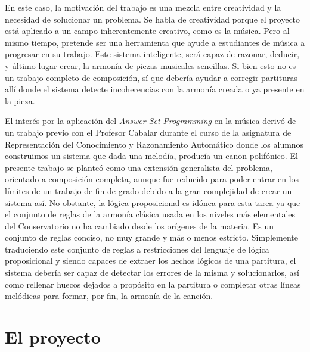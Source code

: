  En este caso, la motivación del trabajo es una mezcla entre creatividad y la necesidad de solucionar un problema. Se habla de creatividad porque el proyecto está aplicado a un campo inherentemente creativo, como es la música. Pero al mismo tiempo, pretende ser una herramienta que ayude a estudiantes de música a progresar en su trabajo. Este sistema inteligente, será capaz de razonar, deducir, y último lugar crear, la armonía de piezas musicales sencillas. Si bien esto no es un trabajo completo de composición, sí que debería ayudar a corregir partituras allí donde el sistema detecte incoherencias con la armonía creada o ya presente en la pieza. 
 
 El interés por la aplicación del \textit{Answer Set Programming} en la música derivó de un trabajo previo con el Profesor Cabalar durante el curso de la asignatura de Representación del Conocimiento y Razonamiento Automático donde los alumnos construimos un sistema que dada una melodía, producía un canon polifónico. El presente trabajo se planteó como una extensión generalista del problema, orientado a composición completa, aunque fue reducido para poder entrar en los límites de un trabajo de fin de grado debido a la gran complejidad de crear un sistema así. No obstante, la lógica proposicional es idónea para esta tarea ya que el conjunto de reglas de la armonía clásica usada en los niveles más elementales del Conservatorio no ha cambiado desde los orígenes de la materia. Es un conjunto de reglas conciso, no muy grande y más o menos estricto. Simplemente traduciendo este conjunto de reglas a restricciones del lenguaje de lógica proposicional y siendo capaces de extraer los hechos lógicos de una partitura, el sistema debería ser capaz de detectar los errores de la misma y solucionarlos, así como rellenar huecos dejados a propósito en la partitura o completar otras líneas melódicas para formar, por fin, la armonía de la canción.
 
 \section{El proyecto}
 
